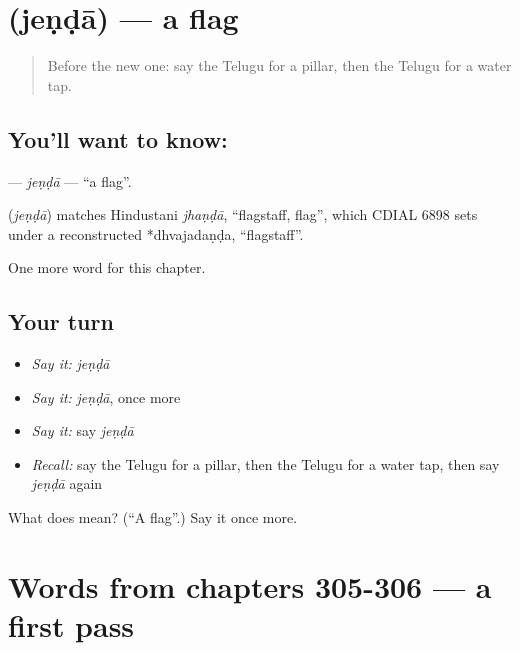 \section[\texorpdfstring{\te{జెండా} (jeṇḍā)}{జెండా (jeṇḍā)}]{ (jeṇḍā) — a flag}

\label{lesson:TE-C309-jenda}



\begin{quote}
Before the new one: say the Telugu for a pillar, then the Telugu for a water tap.
\end{quote}

\subsection*{You'll want to know: }
\textbf{} — \emph{jeṇḍā} — \textquotedblleft{}a flag\textquotedblright{}.

\begin{cousinweb}
\textbf{} (\emph{jeṇḍā}) matches Hindustani \emph{jhaṇḍā}, \textquotedblleft{}flagstaff, flag\textquotedblright{}, which CDIAL 6898 sets under a reconstructed *dhvajadaṇḍa, \textquotedblleft{}flagstaff\textquotedblright{}.
\end{cousinweb}

\begin{grammarlens}[title={What you've built}]
One more word for this chapter.
\end{grammarlens}

\subsection*{Your turn}
\begin{itemize}
\raggedright
  \item \emph{Say it:} \emph{jeṇḍā}
  \item \emph{Say it:} \emph{jeṇḍā}, once more
  \item \emph{Say it:} say \emph{jeṇḍā}
  \item \emph{Recall:} say the Telugu for a pillar, then the Telugu for a water tap, then say \emph{jeṇḍā} again
\end{itemize}

\begin{tcolorbox}[breakable,colback=teal!4,colframe=teal!35!black,title={Before you move on}]
What does  mean? (\textquotedblleft{}A flag\textquotedblright{}.) Say it once more.
\end{tcolorbox}
\section[(dialogue)]{Words from chapters 305-306 — a first pass}


